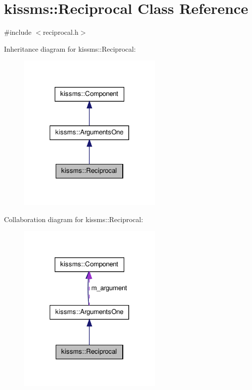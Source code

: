 \hypertarget{classkissms_1_1_reciprocal}{\section{kissms\-:\-:Reciprocal Class Reference}
\label{classkissms_1_1_reciprocal}
}


{\ttfamily \#include $<$reciprocal.\-h$>$}



Inheritance diagram for kissms\-:\-:Reciprocal\-:
\nopagebreak
\begin{figure}[H]
\begin{center}
\leavevmode
\includegraphics[width=198pt]{classkissms_1_1_reciprocal__inherit__graph}
\end{center}
\end{figure}


Collaboration diagram for kissms\-:\-:Reciprocal\-:
\nopagebreak
\begin{figure}[H]
\begin{center}
\leavevmode
\includegraphics[width=198pt]{classkissms_1_1_reciprocal__coll__graph}
\end{center}
\end{figure}
